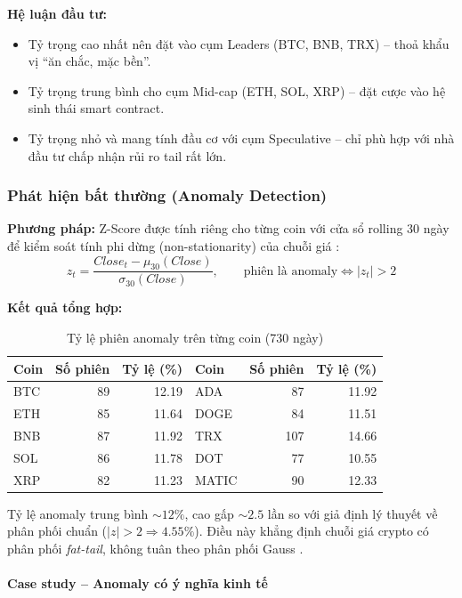 \textbf{Hệ luận đầu tư:}
\begin{itemize}
    \item Tỷ trọng cao nhất nên đặt vào cụm Leaders (BTC, BNB, TRX) -- thoả khẩu vị ``ăn chắc, mặc bền''.
    \item Tỷ trọng trung bình cho cụm Mid-cap (ETH, SOL, XRP) -- đặt cược vào hệ sinh thái smart contract.
    \item Tỷ trọng nhỏ và mang tính đầu cơ với cụm Speculative -- chỉ phù hợp với nhà đầu tư chấp nhận rủi ro tail rất lớn.
\end{itemize}

\subsubsection{Phát hiện bất thường (Anomaly Detection)}

\textbf{Phương pháp:} Z-Score được tính riêng cho từng coin với cửa sổ rolling 30 ngày để kiểm soát tính phi dừng (non-stationarity) của chuỗi giá \cite{hyndman2021}:
\[
z_t = \frac{Close_t - \mu_{30}(Close)}{\sigma_{30}(Close)}, \qquad \text{phiên là anomaly} \iff |z_t| > 2
\]

\textbf{Kết quả tổng hợp:}

\begin{table}[H]
\centering
\caption{Tỷ lệ phiên anomaly trên từng coin (730 ngày)}
\label{tab:anomaly_summary}
\small
\begin{tabular}{@{}lrr|lrr@{}}
\toprule
\textbf{Coin} & \textbf{Số phiên} & \textbf{Tỷ lệ (\%)} & \textbf{Coin} & \textbf{Số phiên} & \textbf{Tỷ lệ (\%)} \\ \midrule
BTC  & 89  & 12.19 & ADA   & 87  & 11.92 \\
ETH  & 85  & 11.64 & DOGE  & 84  & 11.51 \\
BNB  & 87  & 11.92 & TRX   & 107 & 14.66 \\
SOL  & 86  & 11.78 & DOT   & 77  & 10.55 \\
XRP  & 82  & 11.23 & MATIC & 90  & 12.33 \\ \bottomrule
\end{tabular}
\end{table}

Tỷ lệ anomaly trung bình $\sim 12\%$, cao gấp $\sim 2.5$ lần so với giả định lý thuyết về phân phối chuẩn ($|z|>2 \Rightarrow 4.55\%$). Điều này khẳng định chuỗi giá crypto có phân phối \emph{fat-tail}, không tuân theo phân phối Gauss \cite{hull2017}.

\paragraph{Case study -- Anomaly có ý nghĩa kinh tế}

